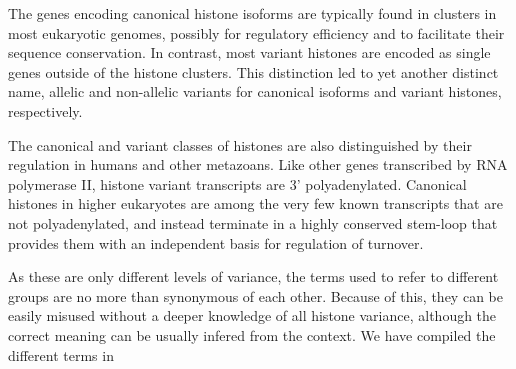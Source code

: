   The genes encoding canonical histone isoforms are typically found in clusters in most eukaryotic
  genomes, possibly for regulatory efficiency and to facilitate their sequence conservation. In
  contrast, most variant histones are encoded as single genes outside of the histone clusters.
  This distinction led to yet another distinct name, allelic and non-allelic variants for
  canonical isoforms and variant histones, respectively\addref{}.

  The canonical and variant classes of histones are also distinguished by their regulation in humans and other
  metazoans. Like other genes transcribed by RNA polymerase II,  histone variant transcripts
  are 3' polyadenylated. Canonical histones in higher eukaryotes are among the very few known transcripts
  that are not polyadenylated, and instead terminate in a highly conserved stem-loop that
  provides them with an independent basis for regulation of turnover.


  As these are only different levels of variance, the terms used to refer to
  different groups are no more than synonymous of each other. Because of this,
  they can be easily misused without a deeper knowledge of all histone variance,
  although the correct meaning can be usually infered from the context. We
  have compiled the different terms in 



